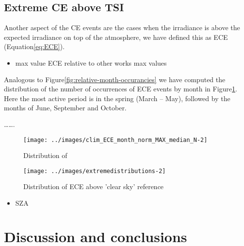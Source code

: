 \documentclass[
]{article}
\providecommand{\tightlist}{%
  \setlength{\itemsep}{0pt}\setlength{\parskip}{0pt}}
\begin{document}
\FloatBarrier

\hypertarget{extreme-ce-above-tsi}{%
\subsection{Extreme CE above TSI}\label{extreme-ce-above-tsi}}

Another aspect of the CE events are the cases when the irradiance is above the
expected irradiance on top of the atmosphere, we have defined this as ECE
(Equation\nobreakspace{}\ref{eq:ECE}).

\begin{itemize}
\tightlist
\item
  max value ECE
  relative to other works max values
\end{itemize}

Analogous to Figure\nobreakspace{}\ref{fig:relative-month-occurancies} we have
computed the distribution of the number of occurrences of ECE events by month in
Figure\nobreakspace{}\ref{fig:relative-month-occurancies-ECE}. Here the most active
period is in the spring (March -- May), followed by the months of June, September and
October.

\ldots\ldots.

\begin{figure}[h!]

{\centering \texttt{[image: ../images/clim\_ECE\_month\_norm\_MAX\_median\_N-2]} 

}

\caption{Distribution of }\label{fig:relative-month-occurancies-ECE}
\end{figure}

\begin{figure}[h!]

{\centering \texttt{[image: ../images/extremedistributions-2]} 

}

\caption{Distribution of ECE above 'clear sky' reference}\label{fig:unnamed-chunk-4}
\end{figure}

\begin{itemize}
\tightlist
\item
  SZA
\end{itemize}

\FloatBarrier

\hypertarget{discussion-and-conclusions}{%
\section{Discussion and conclusions}\label{discussion-and-conclusions}}
\end{document}
